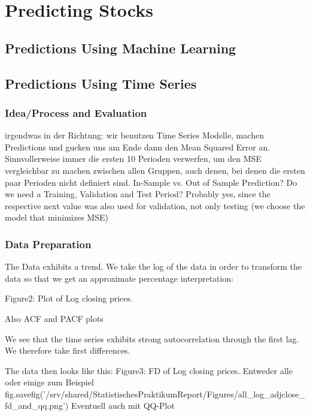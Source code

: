 \chapter{Predicting Stocks}\label{ch:predictions}


\section{Predictions Using Machine Learning}

\section{Predictions Using Time Series}
\subsection{Idea/Process and Evaluation}
irgendwas in der Richtung: wir benutzen Time Series Modelle, machen Predictions und gucken uns am Ende dann den Mean Squared Error an. Sinnvollerweise immer die ersten 10 Perioden verwerfen, um den MSE vergleichbar zu machen zwischen allen Gruppen, auch denen, bei denen die ersten paar Perioden nicht definiert sind. 	
In-Sample vs. Out of Sample Prediction?
Do we need a Training, Validation and Test Period? Probably yes, since the respective next value was also used for validation, not only testing (we choose the model that minimizes MSE)

\subsection{Data Preparation}

The Data exhibits a trend. We take the log of the data in order to transform the data so that we get an approximate percentage interpretation:

Figure2: Plot of Log closing prices.
%

Also ACF and PACF plots
\begin{adjustbox}{width=.9\textwidth,center}
    
\end{adjustbox}



We see that the time series exhibits strong autocorrelation through the first lag. We therefore take first differences. 

The data then looks like this: 
Figure3: FD of Log closing prices. Entweder alle oder einige zum Beispiel
fig.savefig('/srv/shared/StatistischesPraktikumReport/Figures/all_log_adjclose_fd_and_qq.png')
Eventuell auch mit QQ-Plot

